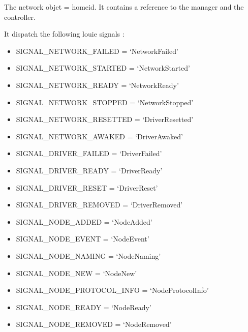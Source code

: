 \documentclass[letterpaper,10pt,english]{sphinxmanual}
\begin{document}
\begin{fulllineitems}
\label{network:openzwave.network.ZWaveNetwork}
The network objet = homeid.
It contains a reference to the manager and the controller.

It dispatch the following louie signals :
\begin{itemize}
\item {} 
SIGNAL\_NETWORK\_FAILED = `NetworkFailed'

\item {} 
SIGNAL\_NETWORK\_STARTED = `NetworkStarted'

\item {} 
SIGNAL\_NETWORK\_READY = `NetworkReady'

\item {} 
SIGNAL\_NETWORK\_STOPPED = `NetworkStopped'

\item {} 
SIGNAL\_NETWORK\_RESETTED = `DriverResetted'

\item {} 
SIGNAL\_NETWORK\_AWAKED = `DriverAwaked'

\item {} 
SIGNAL\_DRIVER\_FAILED = `DriverFailed'

\item {} 
SIGNAL\_DRIVER\_READY = `DriverReady'

\item {} 
SIGNAL\_DRIVER\_RESET = `DriverReset'

\item {} 
SIGNAL\_DRIVER\_REMOVED = `DriverRemoved'

\item {} 
SIGNAL\_NODE\_ADDED = `NodeAdded'

\item {} 
SIGNAL\_NODE\_EVENT = `NodeEvent'

\item {} 
SIGNAL\_NODE\_NAMING = `NodeNaming'

\item {} 
SIGNAL\_NODE\_NEW = `NodeNew'

\item {} 
SIGNAL\_NODE\_PROTOCOL\_INFO = `NodeProtocolInfo'

\item {} 
SIGNAL\_NODE\_READY = `NodeReady'

\item {} 
SIGNAL\_NODE\_REMOVED = `NodeRemoved'


\end{itemize}
\end{fulllineitems}
\end{document}
